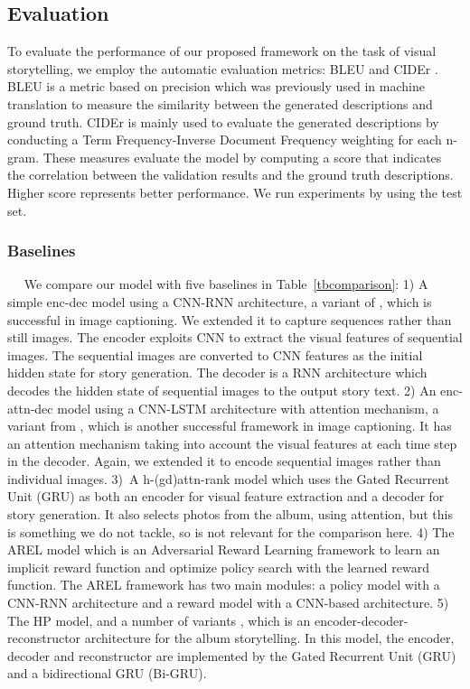 \documentclass[a4paper,fleqn]{cas-sc}
\begin{document}
\subsection{  Evaluation} To evaluate the performance of our proposed framework on the task of visual storytelling, we employ the automatic evaluation metrics: BLEU \citep{BLEU2002} and CIDEr \citep{CIDEr2014}. BLEU is a metric based on precision which was previously used in  machine translation to measure the similarity between the generated descriptions and ground truth. CIDEr is mainly used to evaluate the generated descriptions by conducting a Term Frequency-Inverse Document Frequency weighting for each n-gram. These measures evaluate the model by computing a score that indicates the correlation between the validation results and the ground truth descriptions. Higher score represents better performance. We run experiments by using the test set. 






\subsubsection{Baselines}
~~
We compare our model with five baselines in Table~\ref{tbcomparison}: 
1) A simple enc-dec model using a CNN-RNN architecture, a variant of \citep{Vinyals2014Show}, which is successful in image captioning. We extended it to capture sequences rather than still images. The encoder exploits CNN to extract the visual features of sequential images.
The sequential images are converted to CNN features as the initial hidden state for story generation. 
The decoder is a RNN architecture which decodes the hidden state of sequential images to the output story text. 
2) An enc-attn-dec model using a CNN-LSTM architecture with attention mechanism, a variant from \citep{Xu2015Show}, which is another successful framework in image captioning.  It has an attention mechanism taking into account the visual features at each time step in the decoder. Again, we extended it to encode sequential images rather than individual images.
3)~A h-(gd)attn-rank model \citep{Yulicheng2017} which uses the Gated Recurrent Unit (GRU) as both an encoder for visual feature extraction and a decoder for story generation. It also selects photos from the album, using attention, but this is something we do not tackle, so is not relevant for the comparison here.
4) The AREL model \citep{wang-etal-2018-metrics} which is an Adversarial Reward Learning framework to learn an implicit reward function and optimize policy search with the learned reward function. The AREL framework  has two main modules: a policy model with a CNN-RNN architecture and a reward model with a CNN-based architecture.
5) The HP model, and a number of variants \citep{wang2019}, which is an encoder-decoder-reconstructor architecture for the album storytelling. In this model, the encoder, decoder and reconstructor are implemented by the Gated Recurrent Unit (GRU) and a bidirectional GRU (Bi-GRU).
\end{document}
